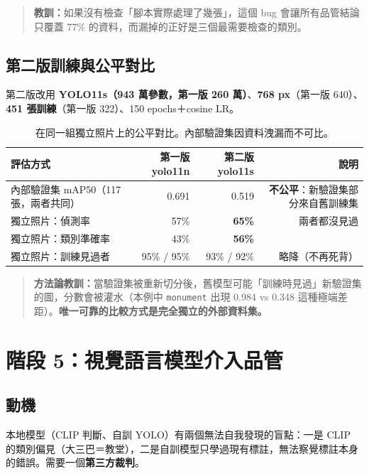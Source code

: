 \documentclass[11pt,a4paper,fontset=windows]{ctexart}
\begin{document}
\begin{quote}
\textbf{教訓：}如果沒有檢查「腳本實際處理了幾張」，這個 bug 會讓所有品管結論只覆蓋 77\% 的資料，而漏掉的正好是三個最需要檢查的類別。
\end{quote}

\subsection{第二版訓練與公平對比}
第二版改用 \textbf{YOLO11s（943 萬參數，第一版 260 萬）}、\textbf{768 px}（第一版 640）、\textbf{451 張訓練}（第一版 322）、150 epochs＋cosine LR。

\begin{table}[H]
\centering\small
\begin{tabular}{@{}lrrr@{}}
\toprule
\textbf{評估方式} & \textbf{第一版 yolo11n} & \textbf{第二版 yolo11s} & \textbf{說明} \\
\midrule
內部驗證集 mAP50（117 張，兩者共同） & 0.691 & 0.519 & \textbf{不公平}：新驗證集部分來自舊訓練集 \\
\midrule
獨立照片：偵測率 & 57\% & \textbf{65\%} & 兩者都沒見過 \\
獨立照片：類別準確率 & 43\% & \textbf{56\%} & \\
獨立照片：訓練見過者 & 95\% / 95\% & 93\% / 92\% & 略降（不再死背） \\
\bottomrule
\end{tabular}
\caption{在同一組獨立照片上的公平對比。內部驗證集因資料洩漏而不可比。}
\end{table}

\begin{quote}
\textbf{方法論教訓：}當驗證集被重新切分後，舊模型可能「訓練時見過」新驗證集的圖，分數會被灌水（本例中 \texttt{monument} 出現 0.984 vs 0.348 這種極端差距）。\textbf{唯一可靠的比較方式是完全獨立的外部資料集。}
\end{quote}

\section{階段 5：視覺語言模型介入品管}

\subsection{動機}
本地模型（CLIP 判斷、自訓 YOLO）有兩個無法自我發現的盲點：一是 CLIP 的類別偏見（大三巴＝教堂），二是自訓模型只學過現有標註，無法察覺標註本身的錯誤。需要一個\textbf{第三方裁判}。
\end{document}
